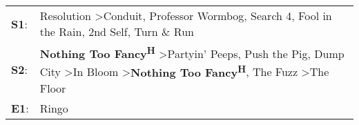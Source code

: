 \begin{supertabular}{p{0.03\textwidth}p{0.92\textwidth}}
 \textbf{S1}:  &                                                                                                        Resolution\textsuperscript{} \textgreater \enspace Conduit\textsuperscript{}, \enspace Professor Wormbog\textsuperscript{}, \enspace Search 4\textsuperscript{}, \enspace Fool in the Rain\textsuperscript{}, \enspace 2nd Self\textsuperscript{}, \enspace Turn \& Run\textsuperscript{}  \enspace  \\
 \textbf{S2}:  &  \textbf{Nothing Too Fancy\textsuperscript{H}} \textgreater \enspace Partyin' Peeps\textsuperscript{}, \enspace Push the Pig\textsuperscript{}, \enspace Dump City\textsuperscript{} \textgreater \enspace In Bloom\textsuperscript{} \textgreater \enspace \textbf{Nothing Too Fancy\textsuperscript{H}}, \enspace The Fuzz\textsuperscript{} \textgreater \enspace The Floor\textsuperscript{}  \enspace  \\
 \textbf{E1}:  &                                                                                                                                                                                                                                                                                                                                                                          Ringo\textsuperscript{}  \enspace  \\
\end{supertabular}
